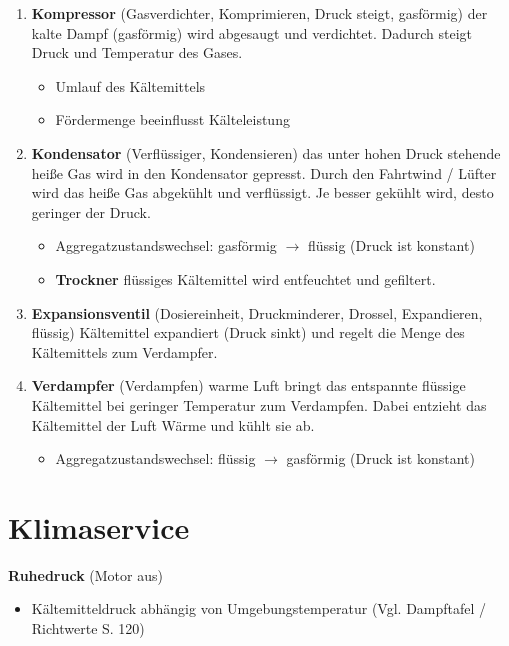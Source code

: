 \begin{enumerate}
\item
  \textbf{Kompressor} (Gasverdichter, Komprimieren, Druck steigt,
  gasförmig) der kalte Dampf (gasförmig) wird abgesaugt und verdichtet.
  Dadurch steigt Druck und Temperatur des Gases.

  \begin{itemize}
  \item
    Umlauf des Kältemittels
  \item
    Fördermenge beeinflusst Kälteleistung
  \end{itemize}
\item
  \textbf{Kondensator} (Verflüssiger, Kondensieren) das unter hohen
  Druck stehende heiße Gas wird in den Kondensator gepresst. Durch den
  Fahrtwind / Lüfter wird das heiße Gas abgekühlt und verflüssigt. Je
  besser gekühlt wird, desto geringer der Druck.

  \begin{itemize}
  \item
    Aggregatzustandswechsel: gasförmig $\to$ flüssig (Druck ist
    konstant)
  \item
    \textbf{Trockner} flüssiges Kältemittel wird entfeuchtet und
    gefiltert.
  \end{itemize}
\item
  \textbf{Expansionsventil} (Dosiereinheit, Druckminderer, Drossel,
  Expandieren, flüssig) Kältemittel expandiert (Druck sinkt) und regelt
  die Menge des Kältemittels zum Verdampfer.
\item
  \textbf{Verdampfer} (Verdampfen) warme Luft bringt das entspannte
  flüssige Kältemittel bei geringer Temperatur zum Verdampfen. Dabei
  entzieht das Kältemittel der Luft Wärme und kühlt sie ab.

  \begin{itemize}
  \item
    Aggregatzustandswechsel: flüssig $\to$ gasförmig (Druck ist
    konstant)
  \end{itemize}
\end{enumerate}

\section{Klimaservice}\label{klimaservice}

\textbf{Ruhedruck} (Motor aus)

\begin{itemize}
\item
  Kältemitteldruck abhängig von Umgebungstemperatur (Vgl. Dampftafel /
  Richtwerte \textcite{schmidt:2015:klima} S. 120)
\end{itemize}


